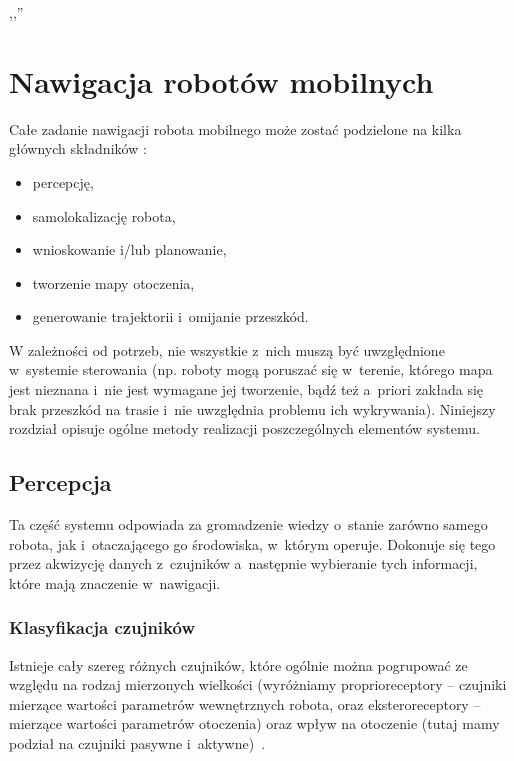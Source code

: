 

\begin{savequote}[70mm]
,,''
\qauthor{}
\end{savequote}

\chapter{Nawigacja robotów mobilnych}
\label{chap:nawigacja}

Całe zadanie nawigacji robota mobilnego może zostać podzielone na kilka głównych
składników \cite[cz.~9]{szynkiewiczWR}:

\begin{itemize}
  \item percepcję,
  \item samolokalizację robota,
  \item wnioskowanie i/lub planowanie,
  \item tworzenie mapy otoczenia,
  \item generowanie trajektorii i~omijanie przeszkód.
\end{itemize}

W zależności od potrzeb, nie wszystkie z~nich muszą być uwzględnione w~systemie
sterowania (np. roboty mogą poruszać się w~terenie, którego mapa jest nieznana
i~nie jest wymagane jej tworzenie, bądź też a~priori zakłada się brak
przeszkód na trasie i~nie uwzględnia problemu ich wykrywania). Niniejszy
rozdział opisuje ogólne metody realizacji poszczególnych elementów systemu.

\section{Percepcja}

Ta część systemu odpowiada za gromadzenie wiedzy o~stanie zarówno samego robota,
jak i~otaczającego go środowiska, w~którym operuje. Dokonuje się tego przez
akwizycję danych z~czujników a~następnie wybieranie tych informacji, które mają
znaczenie w~nawigacji.

\subsection{Klasyfikacja czujników}

Istnieje cały szereg różnych
czujników, które ogólnie można pogrupować ze względu na rodzaj mierzonych
wielkości (wyróżniamy proprioreceptory -- czujniki mierzące wartości parametrów
wewnętrznych robota, oraz eksteroreceptory -- mierzące wartości parametrów
otoczenia) oraz wpływ na otoczenie (tutaj mamy podział na czujniki pasywne 
i~aktywne)~\cite{siegwart}.


